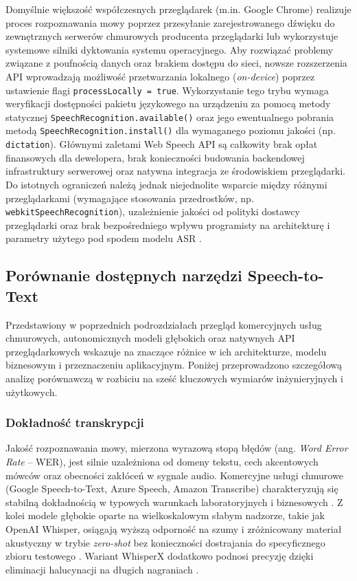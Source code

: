 Domyślnie większość współczesnych przeglądarek (m.in. Google Chrome) realizuje proces rozpoznawania mowy poprzez przesyłanie zarejestrowanego dźwięku do zewnętrznych serwerów chmurowych producenta przeglądarki lub wykorzystuje systemowe silniki dyktowania systemu operacyjnego. Aby rozwiązać problemy związane z poufnością danych oraz brakiem dostępu do sieci, nowsze rozszerzenia API wprowadzają możliwość przetwarzania lokalnego (\textit{on-device}) poprzez ustawienie flagi \texttt{processLocally = true}. Wykorzystanie tego trybu wymaga weryfikacji dostępności pakietu językowego na urządzeniu za pomocą metody statycznej \texttt{SpeechRecognition.available()} oraz jego ewentualnego pobrania metodą \texttt{SpeechRecognition.install()} dla wymaganego poziomu jakości (np. \texttt{dictation}). Głównymi zaletami Web Speech API są całkowity brak opłat finansowych dla dewelopera, brak konieczności budowania backendowej infrastruktury serwerowej oraz natywna integracja ze środowiskiem przeglądarki. Do istotnych ograniczeń należą jednak niejednolite wsparcie między różnymi przeglądarkami (wymagające stosowania przedrostków, np. \texttt{webkitSpeechRecognition}), uzależnienie jakości od polityki dostawcy przeglądarki oraz brak bezpośredniego wpływu programisty na architekturę i parametry użytego pod spodem modelu ASR \cite{mdnWebSpeechAPI}.

\subsection{Porównanie dostępnych narzędzi Speech-to-Text}
\label{subsec:asr_comparison}

Przedstawiony w poprzednich podrozdziałach przegląd komercyjnych usług chmurowych, autonomicznych modeli głębokich oraz natywnych API przeglądarkowych wskazuje na znaczące różnice w ich architekturze, modelu biznesowym i przeznaczeniu aplikacyjnym. Poniżej przeprowadzono szczegółową analizę porównawczą w rozbiciu na sześć kluczowych wymiarów inżynieryjnych i użytkowych.

\subsubsection{Dokładność transkrypcji}
Jakość rozpoznawania mowy, mierzona wyrazową stopą błędów (ang. \textit{Word Error Rate} -- WER), jest silnie uzależniona od domeny tekstu, cech akcentowych mówców oraz obecności zakłóceń w sygnale audio. Komercyjne usługi chmurowe (Google Speech-to-Text, Azure Speech, Amazon Transcribe) charakteryzują się stabilną dokładnością w typowych warunkach laboratoryjnych i biznesowych \cite[s.~6--7]{ferraro2023benchmarking}. Z kolei modele głębokie oparte na wielkoskalowym słabym nadzorze, takie jak OpenAI Whisper, osiągają wyższą odporność na szumy i zróżnicowany materiał akustyczny w trybie \textit{zero-shot} bez konieczności dostrajania do specyficznego zbioru testowego \cite[s.~1, 8--9]{radford2023robust}. Wariant WhisperX dodatkowo podnosi precyzję dzięki eliminacji halucynacji na długich nagraniach \cite[s.~2]{ferraro2023benchmarking}.

